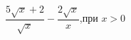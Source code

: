 \begin{ex}[type=calculate_expression]
	\begin{condition}
		\( \dfrac{5\sqrt{x}+2}{\sqrt{x}}-\dfrac{2\sqrt{x}}{x} \),\quad при \( x>0 \)
	\end{condition}
\end{ex}